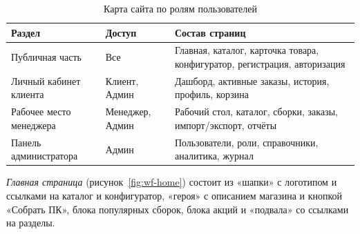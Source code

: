 \begin{table}[ht!]
\caption{Карта сайта по ролям пользователей}
\label{tab:sitemap}
\small
\begin{tabularx}{\textwidth}{|>{\RaggedRight\arraybackslash}p{}|>{\RaggedRight\arraybackslash}p{}|>{\RaggedRight\arraybackslash}X|}
\hline
\textbf{Раздел} & \textbf{Доступ} & \textbf{Состав страниц} \\ \hline
Публичная часть & Все & Главная, каталог, карточка товара, конфигуратор, регистрация, авторизация \\ \hline
Личный кабинет клиента & Клиент, Админ & Дашборд, активные заказы, история, профиль, корзина \\ \hline
Рабочее место менеджера & Менеджер, Админ & Рабочий стол, каталог, сборки, заказы, импорт/экспорт, отчёты \\ \hline
Панель администратора & Админ & Пользователи, роли, справочники, аналитика, журнал \\ \hline
\end{tabularx}
\end{table}

\emph{Главная страница} (рисунок~\ref{fig:wf-home}) состоит из «шапки» с логотипом и ссылками на каталог и конфигуратор, «героя» с описанием магазина и кнопкой «Собрать ПК», блока популярных сборок, блока акций и «подвала» со ссылками на разделы.

